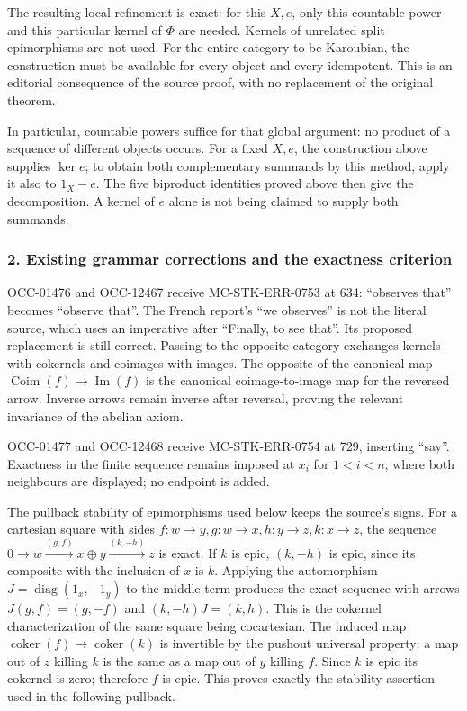 \documentclass[11pt]{article}
\begin{document}
The resulting local refinement is exact: for this \(X,e\), only this countable power and this particular kernel of \(\Phi\) are needed. Kernels of unrelated split epimorphisms are not used. For the entire category to be Karoubian, the construction must be available for every object and every idempotent. This is an editorial consequence of the source proof, with no replacement of the original theorem.

In particular, countable powers suffice for that global argument: no product of a sequence of different objects occurs. For a fixed \(X,e\), the construction above supplies \(\ker e\); to obtain both complementary summands by this method, apply it also to \(1_X-e\). The five biproduct identities proved above then give the decomposition. A kernel of \(e\) alone is not being claimed to supply both summands.

\subsubsection{2. Existing grammar corrections and the exactness criterion}\label{existing-grammar-corrections-and-the-exactness-criterion}

OCC-01476 and OCC-12467 receive MC-STK-ERR-0753 at 634: ``observes that'' becomes ``observe that''. The French report's ``we observes'' is not the literal source, which uses an imperative after ``Finally, to see that''. Its proposed replacement is still correct. Passing to the opposite category exchanges kernels with cokernels and coimages with images. The opposite of the canonical map \(\operatorname{Coim}(f)\to\operatorname{Im}(f)\) is the canonical coimage-to-image map for the reversed arrow. Inverse arrows remain inverse after reversal, proving the relevant invariance of the abelian axiom.

OCC-01477 and OCC-12468 receive MC-STK-ERR-0754 at 729, inserting ``say''. Exactness in the finite sequence remains imposed at \(x_i\) for \(1<i<n\), where both neighbours are displayed; no endpoint is added.

The pullback stability of epimorphisms used below keeps the source's signs. For a cartesian square with sides \(f:w\to y,g:w\to x,h:y\to z,k:x\to z\), the sequence \(0\to w\xrightarrow{(g,f)}x\oplus y\xrightarrow{(k,-h)}z\) is exact. If \(k\) is epic, \((k,-h)\) is epic, since its composite with the inclusion of \(x\) is \(k\). Applying the automorphism \(J=\operatorname{diag}(1_x,-1_y)\) to the middle term produces the exact sequence with arrows \(J(g,f)=(g,-f)\) and \((k,-h)J=(k,h)\). This is the cokernel characterization of the same square being cocartesian. The induced map \(\operatorname{coker}(f)\to\operatorname{coker}(k)\) is invertible by the pushout universal property: a map out of \(z\) killing \(k\) is the same as a map out of \(y\) killing \(f\). Since \(k\) is epic its cokernel is zero; therefore \(f\) is epic. This proves exactly the stability assertion used in the following pullback.
\end{document}

